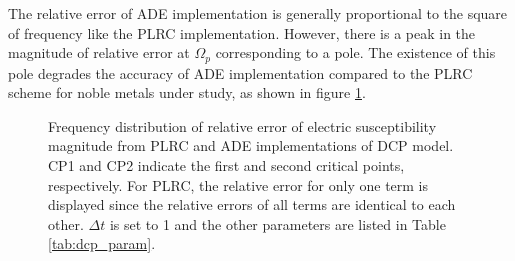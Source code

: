 The relative error of ADE implementation is generally proportional to the square of frequency like the PLRC implementation. However, there is a peak in the magnitude of relative error at $\Omega_p$ corresponding to a pole. The existence of this pole degrades the accuracy of ADE implementation compared to the PLRC scheme for noble metals under study, as shown in figure \ref{fig:delta_noble_metals}.

\begin{figure}[hp!]
  \begin{center}
  \end{center}
  \caption{Frequency distribution of relative error of electric susceptibility magnitude from PLRC and ADE implementations of DCP model. CP1 and CP2 indicate the first and second critical points, respectively. For PLRC, the relative error for only one term is displayed since the relative errors of all terms are identical to each other. $\Delta t$ is set to 1 and the other parameters are listed in Table \ref{tab:dcp_param}.}
  \label{fig:delta_noble_metals}
\end{figure}

